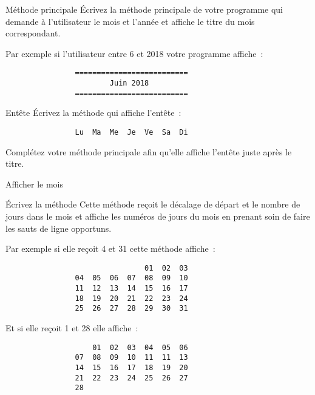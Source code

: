 \documentclass[a4paper,11pt]{article}
\begin{document}
 	\begin{Exercice}{Méthode principale}
		\'Ecrivez la méthode principale de votre programme qui demande à l'utilisateur le mois et l'année et affiche le titre 
		du mois correspondant.
		
		Par exemple si l'utilisateur entre 6 et 2018 votre programme affiche~:
		\begin{verbatim}
                ==========================
                        Juin 2018
                ========================== 
		\end{verbatim}	

	\end{Exercice} 


 	\begin{Exercice}{Entête}
		\'Ecrivez la méthode 
		qui affiche l'entête~:
		\begin{verbatim}
                Lu  Ma  Me  Je  Ve  Sa  Di
		\end{verbatim}
	
		Complétez votre méthode principale afin qu'elle affiche l'entête juste après le titre. 
	\end{Exercice} 
	
	
 	\begin{Exercice}{Afficher le mois}
	
		\'Ecrivez la méthode 
		Cette méthode reçoit le décalage de départ et le nombre de jours dans le mois 
		et affiche les numéros de jours du mois en prenant soin de faire les sauts de ligne opportuns.
		
		Par exemple si elle reçoit 4 et 31 cette méthode affiche~:
		
		\begin{verbatim}
                                01  02  03   
                04  05  06  07  08  09  10   
                11  12  13  14  15  16  17   
                18  19  20  21  22  23  24   
                25  26  27  28  29  30  31      
		\end{verbatim}

		Et si elle reçoit 1 et 28 elle affiche~:
		
		\begin{verbatim}
                    01  02  03  04  05  06 
                07  08  09  10  11  11  13   
                14  15  16  17  18  19  20   
                21  22  23  24  25  26  27   
                28      
		\end{verbatim}

		
	\end{Exercice} 
\end{document}
